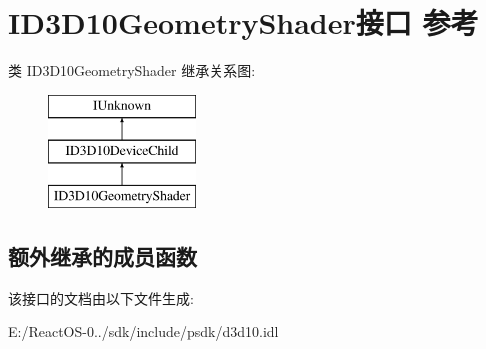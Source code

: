 \hypertarget{interface_i_d3_d10_geometry_shader}{}\section{I\+D3\+D10\+Geometry\+Shader接口 参考}
\label{interface_i_d3_d10_geometry_shader}
类 I\+D3\+D10\+Geometry\+Shader 继承关系图\+:\begin{figure}[H]
\begin{center}
\leavevmode
\includegraphics[height=3.000000cm]{interface_i_d3_d10_geometry_shader}
\end{center}
\end{figure}
\subsection*{额外继承的成员函数}


该接口的文档由以下文件生成\+:\begin{DoxyCompactItemize}
\item 
E\+:/\+React\+O\+S-\/0../sdk/include/psdk/d3d10.\+idl\end{DoxyCompactItemize}
